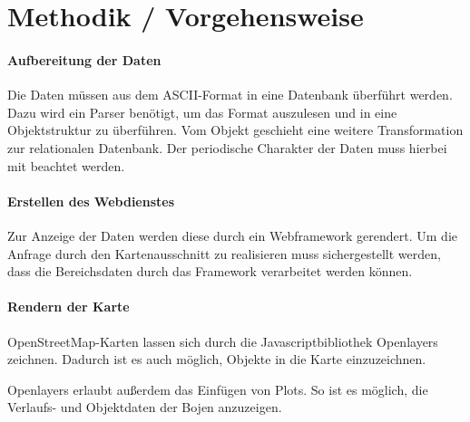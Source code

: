 \section{Methodik / Vorgehensweise}


\paragraph{Aufbereitung der Daten}
Die Daten müssen aus dem ASCII-Format in eine Datenbank überführt werden. Dazu wird ein Parser benötigt, um das Format auszulesen und in eine Objektstruktur zu überführen. Vom Objekt geschieht eine weitere Transformation zur relationalen Datenbank. Der periodische Charakter der Daten muss hierbei mit beachtet werden.

\paragraph{Erstellen des Webdienstes}

Zur Anzeige der Daten werden diese durch ein Webframework gerendert. Um die Anfrage durch den Kartenausschnitt zu realisieren muss sichergestellt werden, dass die Bereichsdaten durch das Framework verarbeitet werden können.

\paragraph{Rendern der Karte}

OpenStreetMap-Karten lassen sich durch die Javascriptbibliothek Openlayers zeichnen. Dadurch ist es auch möglich, Objekte in die Karte einzuzeichnen. 

Openlayers erlaubt außerdem das Einfügen von Plots. So ist es möglich, die Verlaufs- und Objektdaten der Bojen anzuzeigen.
